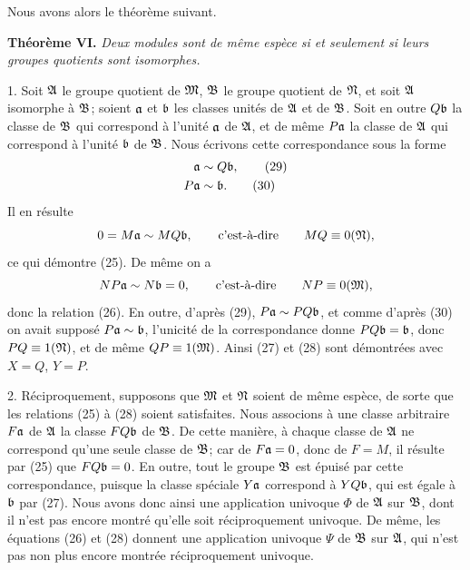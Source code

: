 Nous avons alors le théorème suivant.

\textbf{Théorème VI.} \emph{Deux modules sont de même espèce si et seulement si leurs groupes quotients sont isomorphes.}

1. Soit $\mathfrak{A}$ le groupe quotient de $\mathfrak{M}$, $\mathfrak{B}$ le groupe quotient de $\mathfrak{N}$, et soit $\mathfrak{A}$ isomorphe à $\mathfrak{B}$; soient $\mathfrak{a}$ et $\mathfrak{b}$ les classes unités de $\mathfrak{A}$ et de $\mathfrak{B}$. Soit en outre $Q\mathfrak{b}$ la classe de $\mathfrak{B}$ qui correspond à l'unité $\mathfrak{a}$ de $\mathfrak{A}$, et de même $P\mathfrak{a}$ la classe de $\mathfrak{A}$ qui correspond à l'unité $\mathfrak{b}$ de $\mathfrak{B}$. Nous écrivons cette correspondance sous la forme
\begin{align}
 \mathfrak{a}&\sim Q\mathfrak{b},\tag{29}\\
 P\mathfrak{a}&\sim\mathfrak{b}.\tag{30}
\end{align}
Il en résulte
\[
 0=M\mathfrak{a}\sim MQ\mathfrak{b},
 \qquad\text{c'est-à-dire}\qquad MQ\equiv0(\mathfrak{N}),
\]
ce qui démontre (25). De même on a
\[
 NP\mathfrak{a}\sim N\mathfrak{b}=0,
 \qquad\text{c'est-à-dire}\qquad NP\equiv0(\mathfrak{M}),
\]
donc la relation (26). En outre, d'après (29), $P\mathfrak{a}\sim PQ\mathfrak{b}$, et comme d'après (30) on avait supposé $P\mathfrak{a}\sim\mathfrak{b}$, l'unicité de la correspondance donne $PQ\mathfrak{b}=\mathfrak{b}$, donc $PQ\equiv1(\mathfrak{N})$, et de même $QP\equiv1(\mathfrak{M})$. Ainsi (27) et (28) sont démontrées avec $X=Q$, $Y=P$.

2. Réciproquement, supposons que $\mathfrak{M}$ et $\mathfrak{N}$ soient de même espèce, de sorte que les relations (25) à (28) soient satisfaites. Nous associons à une classe arbitraire $F\mathfrak{a}$ de $\mathfrak{A}$ la classe $FQ\mathfrak{b}$ de $\mathfrak{B}$. De cette manière, à chaque classe de $\mathfrak{A}$ ne correspond qu'une seule classe de $\mathfrak{B}$; car de $F\mathfrak{a}=0$, donc de $F=M$, il résulte par (25) que $FQ\mathfrak{b}=0$. En outre, tout le groupe $\mathfrak{B}$ est épuisé par cette correspondance, puisque la classe spéciale $Y\mathfrak{a}$ correspond à $YQ\mathfrak{b}$, qui est égale à $\mathfrak{b}$ par (27). Nous avons donc ainsi une application univoque $\Phi$ de $\mathfrak{A}$ sur $\mathfrak{B}$, dont il n'est pas encore montré qu'elle soit réciproquement univoque. De même, les équations (26) et (28) donnent une application univoque $\Psi$ de $\mathfrak{B}$ sur $\mathfrak{A}$, qui n'est pas non plus encore montrée réciproquement univoque.

